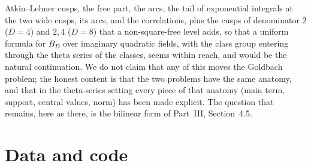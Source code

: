 \documentclass[11pt]{amsart}
\theoremstyle{remark}
\begin{document}
Atkin--Lehner cusps, the free part, the arcs, the tail of exponential integrals at the two wide cusps, its arcs, and the correlations, plus the cusps of denominator $2$ ($D=4$) and $2,4$ ($D=8$) that a non-square-free level adds, so that a uniform formula for $B_D$ over imaginary quadratic fields, with the class group entering through the theta series of the classes, seems within reach, and would be the natural continuation. We do not claim that any of this moves the Goldbach problem; the honest content is that the two problems have the same anatomy, and that in the theta-series setting every piece of that anatomy (main term, support, central values, norm) has been made explicit. The question that remains, here as there, is the bilinear form of Part~III, Section~4.5.

\section*{Data and code}
\end{document}
